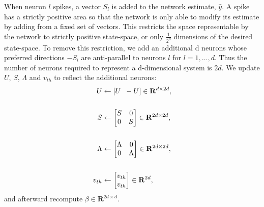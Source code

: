 \begin{enumerate}
When neuron $l$ spikes, a vector $S_l$ is added to the network estimate, $\hat{y}$. A spike has a strictly positive area so that the network is only able to modify its estimate by adding from a fixed set of vectors.  This restricts the space representable by the network to strictly positive state-space, or only $\frac{1}{2^d}$ dimensions of the desired state-space. To remove this restriction, we add an additional d neurons whose preferred directions $-S_l$ are anti-parallel to neurons $l$ for $l=1, \ldots, d$. Thus the number of neurons required to represent a d-dimensional system is $2d$. We update $U$, $S$, $\Lambda$ and $v_{th}$ to reflect the additional neurons:
\begin{align*}
    U &\leftarrow \left[ U \hspace{2mm} -U\right] \in \mathbf{R}^{d \times 2 d},\\
    \\
    S &\leftarrow
    \begin{bmatrix}
    S & 0 \\ 0 & S
    \end{bmatrix}
    \in \mathbf{R}^{2 d \times 2 d},\\
    \\
    \Lambda &\leftarrow
    \begin{bmatrix}
    \Lambda & 0 \\ 0 & \Lambda
    \end{bmatrix}
    \in \mathbf{R}^{2 d \times 2 d},\\
    \\
    v_{th} &\leftarrow 
    \begin{bmatrix}
    v_{th} \\ v_{th}
    \end{bmatrix} \in \mathbf{R}^{2d},
\end{align*}
and afterward recompute $\beta \in \mathbf{R}^{2 d \times d}$. 

\end{enumerate}

